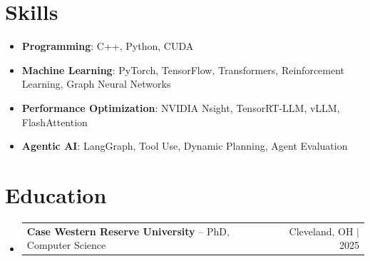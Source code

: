 \documentclass[letterpaper,13pt]{article}
\makeatletter
\newcommand{\resumeProjectHeading}[2]{
    \item
    \begin{tabular*}{\textwidth}{l@{\extracolsep{\fill}}r}
      \small#1 & #2 \\
    \end{tabular*}\vspace{-4pt}
}
\newcommand{\resumeSubHeadingListStart}{\begin{itemize}[leftmargin=0in, label={}]}
\newcommand{\resumeSubHeadingListEnd}{\end{itemize}}
\makeatother
\begin{document}
\section{Skills}
\vspace{0.02cm}
\begin{itemize}[leftmargin=0.15in, label={}, itemsep=2pt, topsep=1pt]
  \item \textbf{Programming}: C++, Python, CUDA
  \item \textbf{Machine Learning}: PyTorch, TensorFlow, Transformers, Reinforcement Learning, Graph Neural Networks
  \item \textbf{Performance Optimization}: NVIDIA Nsight, TensorRT-LLM, vLLM, FlashAttention
  \item \textbf{Agentic AI}: LangGraph, Tool Use, Dynamic Planning, Agent Evaluation
\end{itemize}
\vspace{0.02cm}

\section{Education}
\resumeSubHeadingListStart
  \resumeProjectHeading{\textbf{Case Western Reserve University} -- PhD, Computer Science}{Cleveland, OH $|$ 2025}
\resumeSubHeadingListEnd
\end{document}
